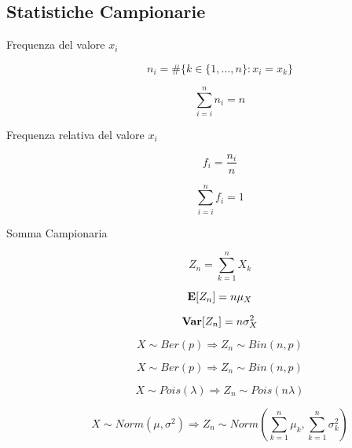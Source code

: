 \subsection{Statistiche Campionarie}
\begin{description}
	
	\item[Frequenza del valore $x_{i}$]
	\begin{equation}
	n_{i} = \#\{k\in\{1,...,n\}: x_{i}=x_{k}\}
	\end{equation}
	
	\begin{equation}
	\sum_{i=i}^{n} n_{i} = n
	\end{equation}
	
	\item[Frequenza relativa del valore $x_{i}$]
	\begin{equation}
	f_{i} = \frac{n_{i}}{n}
	\end{equation}
	
	\begin{equation}
	\sum_{i=i}^{n} f_{i} = 1
	\end{equation}
	
	\item[Somma Campionaria]
	\begin{equation}
	Z_{n} = \sum_{k=1}^{n}X_{k}
	\end{equation}
	
	\begin{equation}
	\mathbf{E}[Z_{n}] = n\mu_{X}
	\end{equation}
	
	\begin{equation}
	\mathbf{Var}[Z_{n}] = n\sigma_{X}^{2}
	\end{equation}
	
	\begin{equation}
	X \sim Ber(p) \Rightarrow Z_{n} \sim Bin(n,p)
	\end{equation}
	
	\begin{equation}
	X \sim Ber(p) \Rightarrow Z_{n} \sim Bin(n,p)
	\end{equation}
	
	\begin{equation}
	X \sim Pois(\lambda) \Rightarrow Z_{n} \sim Pois(n\lambda)
	\end{equation}
	
	\begin{equation}
	X \sim Norm(\mu,\sigma^{2}) \Rightarrow Z_{n} \sim Norm(\sum_{k=1}^{n}\mu_{k}, \sum_{k=1}^{n} \sigma_{k}^{2})
	\end{equation}
	

\end{description}
